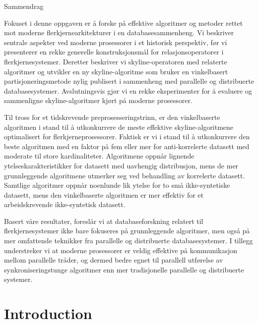 \documentclass[12pt,a4paper,twoside]{report}
\begin{document}
\cleardoublepage
\begin{titlepage}
\begin{poliabstract}{Sammendrag}

Fokuset i denne oppgaven er å forske på effektive algoritmer og
metoder rettet mot moderne flerkjernearkitekturer i en
databasesammenheng. Vi beskriver sentrale aspekter ved moderne
prosessorer i et historisk perspektiv, før vi presenterer en rekke
generelle konstruksjonsmål for relasjonsoperatorer i
flerkjernesystemer.  Deretter beskriver vi skyline-operatoren med
relaterte algoritmer og utvikler en ny skyline-algoritme som bruker en
vinkelbasert partisjoneringsmetode nylig publisert i sammenheng med
parallelle og distribuerte databasesystemer. Avslutningsvis gjør vi en
rekke eksperimenter for å evaluere og sammenligne skyline-algoritmer
kjørt på moderne prosessorer.

Til tross for et tidskrevende preprosesseringstrinn, er den
vinkelbaserte algoritmen i stand til å utkonkurrere de meste effektive
skyline-algoritmene optimalisert for flerkjerneprosessorer.  Faktisk
er vi i stand til å utkonkurrere den beste algoritmen med en faktor på
fem eller mer for anti-korrelerte datasett med moderate til store
kardinaliteter.  Algoritmene oppnår lignende ytelseskarakteristikker
for datasett med uavhengig distribusjon, mens de mer grunnleggende
algoritmene utmerker seg ved behandling av korrelerte datasett.
Samtlige algoritmer oppnår noenlunde lik ytelse for to små
ikke-syntetiske datasett, mens den vinkelbaserte algoritmen er mer
effektiv for et arbeidskrevende ikke-syntetisk datasett.

Basert våre resultater, foreslår vi at databaseforskning relatert til
flerkjernesystemer ikke bare fokuseres på grunnleggende algoritmer,
men også på mer omfattende teknikker fra parallelle og distribuerte
databasesystemer. I tillegg understreker vi at moderne prosessorer er
veldig effektive på kommunikasjon mellom parallelle tråder, og dermed
bedre egnet til parallell utførelse av synkroniseringstunge algoritmer
enn mer tradisjonelle parallelle og distribuerte systemer.

\end{poliabstract}
\end{titlepage}

\cleardoublepage
\tableofcontents
\thispagestyle{empty}


\cleardoublepage
\setcounter{page}{1}
\chapter{Introduction}
\label{chap:introduction}
\end{document}
